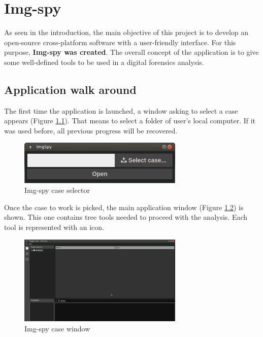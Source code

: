 \chapter{Img-spy}
\label{S:img-spy}

As seen in the introduction, the main objective of this project is to develop
an open-source cross-platform software with a user-friendly interface. For this
purpose, \textbf{Img-spy was created}. The overall concept of the application
is to give some well-defined tools to be used in a digital forensics analysis. 

\section{Application walk around}

The first time the application is launched, a window asking to select a case
appears (Figure \ref{F:img-spy-select-case}). That means to select a folder of
user's local computer. If it was used before, all previous progress will be 
recovered.

\begin{figure}[htb]
	\begin{center}
		\includegraphics[width=0.7\textwidth]{./figures/img-spy-select-case.png}
		\caption{Img-spy case selector}
		\label{F:img-spy-select-case}
	\end{center}
\end{figure}

Once the case to work is picked, the main application window (Figure
\ref{F:img-spy-case-window}) is shown. This one contains tree tools needed to
proceed with the analysis. Each tool is represented with an icon.

\begin{figure}[htb]
	\begin{center}
		\includegraphics[width=0.7\textwidth]{./figures/img-spy-dark.png}
		\caption{Img-spy case window}
		\label{F:img-spy-case-window}
	\end{center}
\end{figure}


